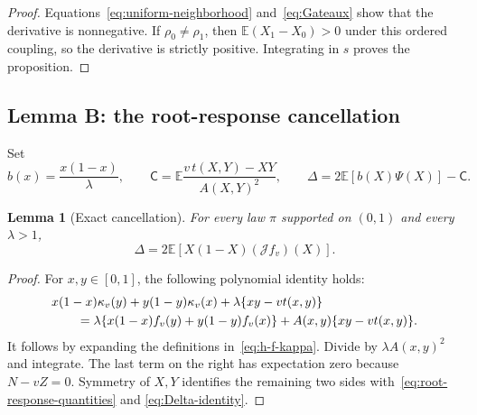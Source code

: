 \documentclass[11pt,a4paper]{article}
\numberwithin{equation}{section}
\theoremstyle{plain}
\newtheorem{lemma}[lemma]{Lemma}
\theoremstyle{definition}
\theoremstyle{remark}
\newcommand{\E}{\mathbb E}
\newcommand{\J}{\mathcal J}
\begin{document}
\begin{proof}
Equations~\eqref{eq:uniform-neighborhood} and~\eqref{eq:Gateaux} show that
the derivative is nonnegative.  If $\rho_0\ne\rho_1$, then
$\E(X_1-X_0)>0$ under this ordered coupling, so the derivative is strictly
positive.  Integrating in $s$ proves the proposition.
\end{proof}

\subsection{Lemma B: the root-response cancellation}

Set
\begin{equation}\label{eq:root-response-quantities}
 b(x)=\frac{x(1-x)}{\lambda},\qquad
 \mathsf C=\E\frac{v\,t(X,Y)-XY}{A(X,Y)^2},\qquad
 \Delta=2\E[b(X)\Psi(X)]-\mathsf C.
\end{equation}

\begin{lemma}[Exact cancellation]\label{lem:cancellation}
For every law $\pi$ supported on $(0,1)$ and every $\lambda>1$,
\begin{equation}\label{eq:Delta-identity}
 \Delta=2\E[X(1-X)(\J f_v)(X)].
\end{equation}
\end{lemma}
\begin{proof}
For $x,y\in[0,1]$, the following polynomial identity holds:
\begin{align}\label{eq:pointwise-cancellation}
 &x(1-x)\kappa_v(y)+y(1-y)\kappa_v(x)
          +\lambda\{xy-vt(x,y)\}\notag\\
 &\qquad=
 \lambda\{x(1-x)f_v(y)+y(1-y)f_v(x)\}
          +A(x,y)\{xy-vt(x,y)\}.
\end{align}
It follows by expanding the definitions in~\eqref{eq:h-f-kappa}.
Divide by $\lambda A(x,y)^2$ and integrate.  The last term on the right
has expectation zero because $N-vZ=0$.  Symmetry of $X,Y$ identifies the
remaining two sides with~\eqref{eq:root-response-quantities} and
\eqref{eq:Delta-identity}.
\end{proof}
\end{document}
